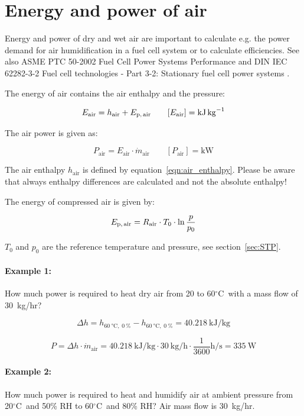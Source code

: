 \documentclass[11pt,a4paper,english,twoside]{scrreprt}
\newcommand{\gradC}{${}^\circ$C}      %
\begin{document}
\section{Energy and power of air}
\label{chap:Energy and power of air}

Energy and power of dry and wet air are important to calculate e.g. the power demand for air humidification in a fuel cell system or to calculate efficiencies. See also ASME PTC 50-2002 Fuel Cell Power Systems Performance \cite{ASME} and DIN IEC 62282-3-2 Fuel cell technologies - Part 3-2: Stationary fuel cell power systems \cite{DIN_62282-3-2}.

The energy of air contains the air enthalpy and the pressure:

\[E_\text{air} =h_\text{air} + E_\text{p,\,air} \qquad [E_\text{air} ] = \si{\kilo\joule\per\kilogram}\]


The air power is given as:

\[
P_\text{air} =E_\text{air} \cdot \dot{m}_\text{air} \qquad [P_\text{air} ] = \si{\kilo\watt}
\]


The air enthalpy $h_\text{air}$ is defined by equation~\ref{eqn:air_enthalpy}. Please be aware that always enthalpy differences are calculated and not the absolute enthalpy!

The energy of compressed air is given by:

\[E_\text{p,\,air} =R_\text{air} \cdot T_0 \cdot \ln \frac{p}{p_0 } \]

$T_0 $ and $p_0 $ are the reference temperature and pressure, see section~\ref{sec:STP}.


\paragraph{Example 1:}
How much power is required to heat dry air from 20 to 60\gradC\ with a mass flow of 30~kg/hr?

\[\Delta h=h_{\SI{60}{\degreeCelsius},\;\SI{0}{\percent}}  - h_{\SI{60}{\degreeCelsius},\;\SI{0}{\percent}}  = \SI{40.218}{\kilo\joule\per\kilogram} 
\]

\[
P=\Delta h\cdot \dot{m}_\text{air}  = \SI{40.218}{\kilo\joule\per\kilogram} \cdot \SI{30}{\kilo\gram\per\hour} \cdot \frac{\num{1}}{\num{3600}}\si{\hour\per\second} = \SI{335}{\watt}
\]



\paragraph{Example 2:}
How much power is required to heat and humidify air at ambient pressure from 20\gradC\ and 50\% RH to 60\gradC\ and 80\% RH? Air mass flow is 30~kg/hr.
\end{document}
